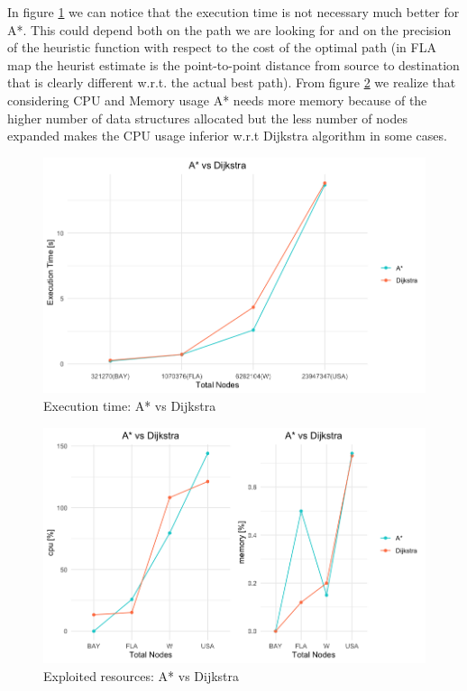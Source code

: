 \documentclass[twocolumn, switch]{article} %
\begin{document}
In figure \ref{astardijkstratime} we can notice that the execution time is not necessary much better for A*.
This could depend both on the path we are looking for and on the precision of the heuristic function with
respect to the cost of the optimal path (in FLA map the heurist estimate is the point-to-point distance from
source to destination that is clearly different w.r.t. the actual best path). From figure \ref{astardijkstracpumem} we realize that considering 
CPU and Memory usage A* needs more memory
because of the higher number of data structures allocated but the less number of nodes expanded makes
the CPU usage inferior w.r.t Dijkstra algorithm in some cases.
\begin{figure}[ht!]
  \centering
  \includegraphics[width=1\linewidth]{astar_dijkstra/execution_time.png}
  \caption{Execution time: A* vs Dijkstra}
  \label{astardijkstratime}
\end{figure}
\begin{figure}[ht!]
  \centering
  \includegraphics[width=1\linewidth]{astar_dijkstra/cpumem.png}
  \caption{Exploited resources: A* vs Dijkstra}
  \label{astardijkstracpumem}
\end{figure}
\end{document}
